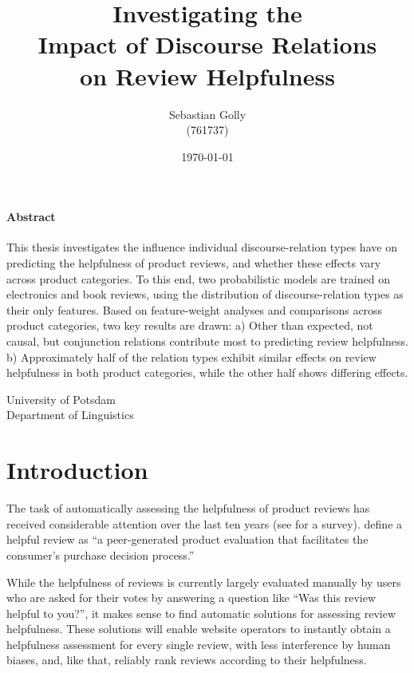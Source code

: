 \documentclass[
    a4paper,%
    12pt,%
    oneside,%
    toc=bibliography,
    final,
]{scrartcl}
\title{Investigating the \\Impact of Discourse Relations\\ on Review Helpfulness}
\subtitle{}
\author{Sebastian Golly\\ {\normalsize (761737)}}
\date{\today}
\begin{document}
\maketitle

\vfill

\paragraph{Abstract}
This thesis investigates the influence individual discourse-relation types have on predicting the helpfulness of product reviews, and whether these effects vary across product categories. To this end, two probabilistic models are trained on electronics and book reviews, using the distribution of discourse-relation types as their only features. Based on feature-weight analyses and comparisons across product categories, two key results are drawn: a) Other than expected, not causal, but conjunction relations contribute most to predicting review helpfulness. b) Approximately half of the relation types exhibit similar effects on review helpfulness in both product categories, while the other half shows differing effects.
\\[3em]

\vfill

\begin{center}
University of Potsdam\\[1.5em]
Department of Linguistics
\end{center}

\thispagestyle{empty}
\newpage


\section{Introduction}

The task of automatically assessing the helpfulness of product reviews has received considerable attention over the last ten years (see \citealt{Almagrabi2015} for a survey). \citet[186]{MudambiSchuff2010} define a helpful review as “a peer-generated product evaluation that facilitates the consumer’s purchase decision process.”

While the helpfulness of reviews is currently largely evaluated manually by users who are asked for their votes by answering a question like “Was this review helpful to you?”, it makes sense to find automatic solutions for assessing review helpfulness. These solutions will enable website operators to instantly obtain a helpfulness assessment for every single review, with less interference by human biases, and, like that, reliably rank reviews according to their helpfulness.
\end{document}
